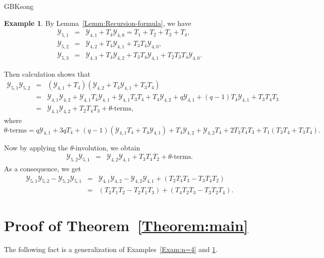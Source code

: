 \documentclass[13pt,a4paper, oneside]{amsart}       %
\numberwithin{equation}{section}
\theoremstyle{definition}
\newtheorem{example}[equation]{Example}
\theoremstyle{remark}
\begin{document}
\begin{CJK*}{GBK}{song}
\begin{example}\label{Exam:n=5}
By Lemma~\ref{Lemm:Recursion-formula}, we have
   \begin{eqnarray*}
 \mathscr{Y}_{5,1}&=&\mathscr{Y}_{4,1}+T_4\mathscr{Y}_{4,0}=T_1+T_2+T_3+T_4,\\
\mathscr{Y}_{5,2}&=&\mathscr{Y}_{4,2}+T_4\mathscr{Y}_{4,1}+T_3T_4\mathscr{Y}_{4,0},\\
 \mathscr{Y}_{5,3}&=&\mathscr{Y}_{4,3}+T_4\mathscr{Y}_{4,2}+
 T_3T_4\mathscr{Y}_{4,1}+T_2T_3T_4\mathscr{Y}_{4,0}.\end{eqnarray*}


Then calculation shows that
\begin{eqnarray*}
\mathscr{Y}_{5,1}\mathscr{Y}_{5,2}&=&
(\mathscr{Y}_{4,1}+T_4)(\mathscr{Y}_{4,2}+T_4\mathscr{Y}_{4,1}+T_3T_4)\\
&=&\mathscr{Y}_{4,1}\mathscr{Y}_{4,2}+\mathscr{Y}_{4,1}T_4\mathscr{Y}_{4,1}
+\mathscr{Y}_{4,1}T_3T_4+T_4\mathscr{Y}_{4,2}
+q\mathscr{Y}_{4,1}+(q-1)T_4\mathscr{Y}_{4,1}+T_3T_4T_3\\
&=&\mathscr{Y}_{4,1}\mathscr{Y}_{4,2}+T_2T_4T_3+
\theta\text{-terms},
\end{eqnarray*}
where
\begin{equation*}
\text{$\theta$-terms}=q\mathscr{Y}_{4,1}+3qT_4+
(q-1)(\mathscr{Y}_{4,1}T_4+T_4\mathscr{Y}_{4,1})+T_4\mathscr{Y}_{4,2}
+\mathscr{Y}_{4,2}T_4+2T_3T_4T_3+T_1(T_3T_4+T_3T_4).
\end{equation*}

Now by applying the $\theta$-involution, we obtain
\begin{eqnarray*}
\mathscr{Y}_{5,2}\mathscr{Y}_{5,1}&=&\mathscr{Y}_{4,2}\mathscr{Y}_{4,1}
+T_3T_4T_2+\theta\text{-terms}.
\end{eqnarray*}
As a consequence, we get
\begin{eqnarray*}
  \mathscr{Y}_{5,1}\mathscr{Y}_{5,2}-\mathscr{Y}_{5,2}\mathscr{Y}_{5,1}
    &=&\mathscr{Y}_{4,1}\mathscr{Y}_{4,2}-\mathscr{Y}_{4,2}\mathscr{Y}_{4,1}
  +(T_2T_4T_3-T_3T_4T_2)\\
&=&(T_3T_1T_2-T_2T_1T_3)+(T_4T_2T_3-T_3T_2T_4).
\end{eqnarray*}
\end{example}
\section{Proof of Theorem~\ref{Theorem:main}}\label{Sec:Proof-Theorem}

The following fact is a generalization of Examples~\ref{Exam:n=4} and \ref{Exam:n=5}.


\end{CJK*}
\end{document}
